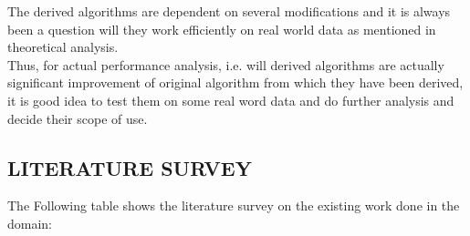 \documentclass[a4paper, 12pt]{article}
\begin{document}
  \hspace{1cm} 
The derived algorithms are dependent on several modifications and it is always been a question will they work efficiently on real world
data as mentioned in theoretical analysis.
\\

\hspace{1cm} Thus, for actual performance analysis, i.e. will derived algorithms are actually significant improvement of original algorithm from which they have been derived, it is good idea to test them on some real word data and do further analysis and decide their scope of use.
\\

\newpage
\begin{center}

\section{LITERATURE SURVEY}

\end{center}

The Following table shows the literature survey on the existing work done in the domain:
\end{document}

